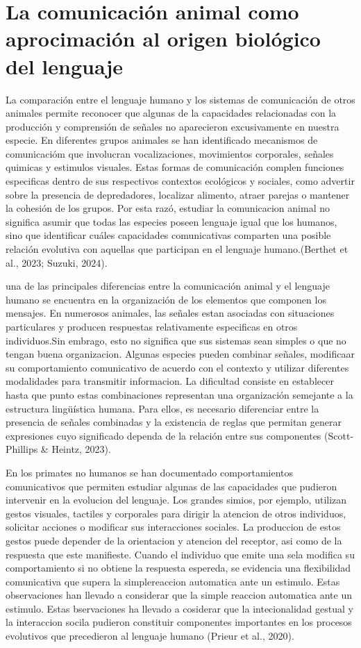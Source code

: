 \documentclass[12pt]{article}
\begin{document}
\section{La comunicación animal como aprocimación al origen biológico del lenguaje}

La comparación entre el lenguaje humano y los sistemas de comunicación de otros animales permite reconocer que algunas de la capacidades relacionadas con la producción y comprensión de señales no aparecieron excusivamente en nuestra especie. En diferentes grupos animales se han identificado mecanismos de comunicacióm que involucran vocalizaciones, movimientos corporales, señales quimicas y estimulos visuales. Estas formas de comunicación complen funciones especificas dentro de sus respectivos contextos ecológicos y sociales, como advertir sobre la presencia de depredadores, localizar alimento, atraer parejas o mantener la cohesión de los grupos. Por esta razó, estudiar la comunicacion animal no significa asumir que todas las especies poseen lenguaje igual que los humanos, sino que identificar cuáles capacidades comunicativas comparten una posible relación evolutiva con aquellas que participan en el lenguaje humano.(Berthet et al., 2023; Suzuki, 2024).

una de las principales diferencias entre la comunicación animal y el lenguaje humano se encuentra en la organización de los elementos que componen los mensajes. En numerosos animales, las señales estan asociadas con situaciones particulares y producen respuestas relativamente especificas en otros individuos.Sin embrago, esto no significa que sus sistemas sean simples o que no tengan buena organizacion. Algunas especies pueden combinar señales, modificaar su comportamiento comunicativo de acuerdo con el contexto y utilizar diferentes modalidades para transmitir informacion. La dificultad consiste en establecer hasta que punto estas combinaciones representan una organización semejante a la estructura lingüística humana. Para ellos, es necesario diferenciar entre la presencia de señales combinadas y la existencia de reglas que permitan generar expresiones cuyo significado dependa de la relación entre sus componentes (Scott-Phillips \& Heintz, 2023).

En los primates no humanos se han documentado comportamientos comunicativos que permiten estudiar algunas de las capacidades que pudieron intervenir en la evolucion del lenguaje. Los grandes simios, por ejemplo, utilizan gestos visuales, tactiles y corporales para dirigir la atencion de otros individuos, solicitar acciones o modificar sus interacciones sociales. La produccion de estos gestos puede depender de la orientacion y atencion del receptor, asi como de la respuesta que este manifieste. Cuando el individuo que emite una sela modifica su comportamiento si no obtiene la respuesta espereda, se evidencia una flexibilidad comunicativa que supera la simplereaccion automatica ante un estimulo. Estas observaciones han llevado a considerar que la simple reaccion automatica ante un estimulo. Estas bservaciones ha llevado a cosiderar que la intecionalidad gestual y la interaccion socila pudieron constituir componentes importantes en los procesos evolutivos que precedieron al lenguaje humano (Prieur et al., 2020).
\end{document}

